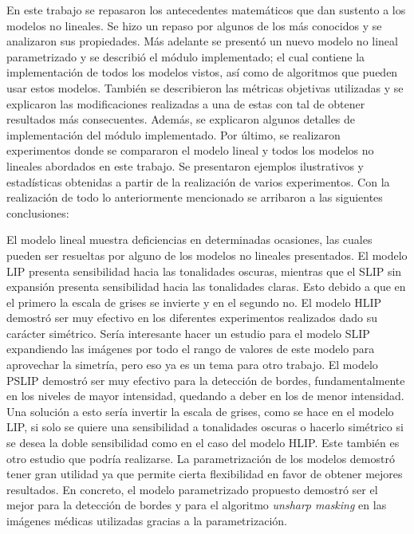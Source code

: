 \begin{conclusions}
    En este trabajo se repasaron los antecedentes matem\'aticos que dan sustento a los modelos no lineales. Se hizo un repaso por algunos de los m\'as conocidos y se analizaron sus propiedades. M\'as adelante se present\'o un nuevo modelo no lineal parametrizado y se describi\'o el m\'odulo implementado; el cual contiene la implementaci\'on de todos los modelos vistos, as\'i como de algoritmos que pueden usar estos modelos. Tambi\'en se describieron las m\'etricas objetivas utilizadas y se explicaron las modificaciones realizadas a una de estas con tal de obtener resultados m\'as consecuentes. Adem\'as, se explicaron algunos detalles de implementaci\'on del m\'odulo implementado. Por \'ultimo, se realizaron experimentos donde se compararon el modelo lineal y todos los modelos no lineales abordados en este trabajo. Se presentaron ejemplos ilustrativos y estad\'isticas obtenidas a partir de la realizaci\'on de varios experimentos. Con la realizaci\'on de todo lo anteriormente mencionado se arribaron a las siguientes conclusiones:
    
    El modelo lineal muestra deficiencias en determinadas ocasiones, las cuales pueden ser resueltas por alguno de los modelos no lineales presentados. El modelo LIP presenta sensibilidad hacia las tonalidades oscuras, mientras que el SLIP sin expansi\'on presenta sensibilidad hacia las tonalidades claras. Esto debido a que en el primero la escala de grises se invierte y en el segundo no. El modelo HLIP demostr\'o ser muy efectivo en los diferentes experimentos realizados dado su car\'acter sim\'etrico. Ser\'ia interesante hacer un estudio para el modelo SLIP expandiendo las im\'agenes por todo el rango de valores de este modelo para aprovechar la simetr\'ia, pero eso ya es un tema para otro trabajo. El modelo PSLIP demostr\'o ser muy efectivo para la detecci\'on de bordes, fundamentalmente en los niveles de mayor intensidad, quedando a deber en los de menor intensidad. Una soluci\'on a esto ser\'ia invertir la escala de grises, como se hace en el modelo LIP, si solo se quiere una sensibilidad a tonalidades oscuras o hacerlo sim\'etrico si se desea la doble sensibilidad como en el caso del modelo HLIP. Este tambi\'en es otro estudio que podr\'ia realizarse. La parametrizaci\'on de los modelos demostr\'o tener gran utilidad ya que permite cierta flexibilidad en favor de obtener mejores resultados. En concreto, el modelo parametrizado propuesto demostr\'o ser el mejor para la detecci\'on de bordes y para el algoritmo \textit{unsharp masking} en las im\'agenes m\'edicas utilizadas gracias a la parametrizaci\'on.
    

\end{conclusions}

